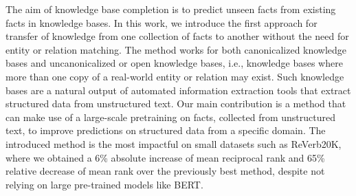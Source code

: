 The aim of knowledge base completion is to predict unseen facts from existing facts in knowledge bases. In this work, we introduce the first approach for transfer of knowledge from one collection of facts to another without the need for entity or relation matching. The method works for both canonicalized knowledge bases and uncanonicalized or open knowledge bases, i.e., knowledge bases where more than one copy of a real-world entity or relation may exist. Such knowledge bases are a natural output of automated information extraction tools that extract structured data from unstructured text. Our main contribution is a method that can make use of a large-scale pretraining on facts, collected from unstructured text, to improve predictions on structured data from a specific domain. The introduced method is the most impactful on small datasets such as  ReVerb20K,  where we obtained a 6\% absolute increase of mean reciprocal rank and 65\% relative decrease of mean rank over the previously best method, despite not relying on large pre-trained models like BERT.
